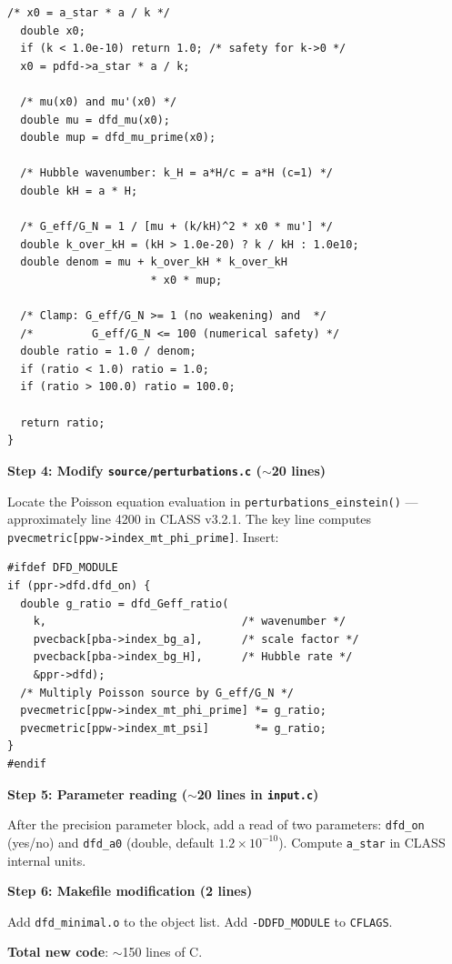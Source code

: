 \documentclass[11pt]{article}
\theoremstyle{definition}
\theoremstyle{remark}
\newcommand{\ee}[1]{\times 10^{#1}}
\begin{document}
\begin{tcolorbox}[colback=green!5!white, colframe=green!60!black,
  title=\textbf{MINIMAL mochi\_class: Complete Coding Specification}]
\begin{lstlisting}[caption={dfd\_minimal.c --- complete implementation}]
  /* x0 = a_star * a / k */
  double x0;
  if (k < 1.0e-10) return 1.0; /* safety for k->0 */
  x0 = pdfd->a_star * a / k;

  /* mu(x0) and mu'(x0) */
  double mu = dfd_mu(x0);
  double mup = dfd_mu_prime(x0);

  /* Hubble wavenumber: k_H = a*H/c = a*H (c=1) */
  double kH = a * H;

  /* G_eff/G_N = 1 / [mu + (k/kH)^2 * x0 * mu'] */
  double k_over_kH = (kH > 1.0e-20) ? k / kH : 1.0e10;
  double denom = mu + k_over_kH * k_over_kH
                      * x0 * mup;

  /* Clamp: G_eff/G_N >= 1 (no weakening) and  */
  /*         G_eff/G_N <= 100 (numerical safety) */
  double ratio = 1.0 / denom;
  if (ratio < 1.0) ratio = 1.0;
  if (ratio > 100.0) ratio = 100.0;

  return ratio;
}
\end{lstlisting}

\textbf{Step 4: Modify \texttt{source/perturbations.c} ($\sim$20 lines)}

Locate the Poisson equation evaluation in
\texttt{perturbations\_einstein()} --- approximately line 4200 in
CLASS v3.2.1. The key line computes
\texttt{pvecmetric[ppw->index\_mt\_phi\_prime]}. Insert:

\begin{lstlisting}[numbers=none]
#ifdef DFD_MODULE
if (ppr->dfd.dfd_on) {
  double g_ratio = dfd_Geff_ratio(
    k,                              /* wavenumber */
    pvecback[pba->index_bg_a],      /* scale factor */
    pvecback[pba->index_bg_H],      /* Hubble rate */
    &ppr->dfd);
  /* Multiply Poisson source by G_eff/G_N */
  pvecmetric[ppw->index_mt_phi_prime] *= g_ratio;
  pvecmetric[ppw->index_mt_psi]       *= g_ratio;
}
#endif
\end{lstlisting}

\textbf{Step 5: Parameter reading ($\sim$20 lines in \texttt{input.c})}

After the precision parameter block, add a read of two parameters:
\texttt{dfd\_on} (yes/no) and \texttt{dfd\_a0} (double, default
$1.2 \ee{-10}$). Compute \texttt{a\_star} in CLASS internal units.

\textbf{Step 6: Makefile modification (2 lines)}

Add \texttt{dfd\_minimal.o} to the object list. Add
\texttt{-DDFD\_MODULE} to \texttt{CFLAGS}.

\textbf{Total new code}: $\sim$150 lines of C.
\end{tcolorbox}
\end{document}

